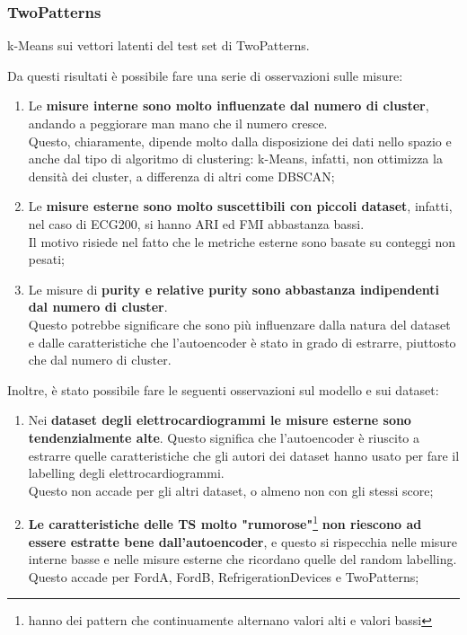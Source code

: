 \subsubsection{TwoPatterns}
\begin{center}
	\begin{table}[H]
		\centering
		\caption{k-Means sui vettori latenti del test set di TwoPatterns.}
	\end{table}
\end{center}

Da questi risultati è possibile fare una serie di osservazioni sulle misure:
\begin{enumerate}
	\item Le \textbf{misure interne sono molto influenzate dal numero di cluster}, andando a peggiorare man mano che il numero cresce.\\
	Questo, chiaramente, dipende molto dalla disposizione dei dati nello spazio e anche dal tipo di algoritmo di clustering: k-Means, infatti, non ottimizza la densità dei cluster, a differenza di altri come DBSCAN;
	\item Le \textbf{misure esterne sono molto suscettibili con piccoli dataset}, infatti, nel caso di ECG200, si hanno ARI ed FMI abbastanza bassi.\\
	Il motivo risiede nel fatto che le metriche esterne sono basate su conteggi non pesati;
	\item Le misure di \textbf{purity e relative purity sono abbastanza indipendenti dal numero di cluster}.\\
	Questo potrebbe significare che sono più influenzare dalla natura del dataset e dalle caratteristiche che l'autoencoder è stato in grado di estrarre, piuttosto che dal numero di cluster.
\end{enumerate}

Inoltre, è stato possibile fare le seguenti osservazioni sul modello e sui dataset:
\begin{enumerate}	
	\item Nei \textbf{dataset degli elettrocardiogrammi le misure esterne sono tendenzialmente alte}. Questo significa che l'autoencoder è riuscito a estrarre quelle caratteristiche che gli autori dei dataset hanno usato per fare il labelling degli elettrocardiogrammi.\\
	Questo non accade per gli altri dataset, o almeno non con gli stessi score;
	\item \textbf{Le caratteristiche delle TS molto "rumorose"}\footnote{hanno dei pattern che continuamente alternano valori alti e valori bassi} \textbf{non riescono ad essere estratte bene dall'autoencoder}, e questo si rispecchia nelle misure interne basse e nelle misure esterne che ricordano quelle del random labelling. Questo accade per FordA, FordB, RefrigerationDevices e TwoPatterns;
\end{enumerate}